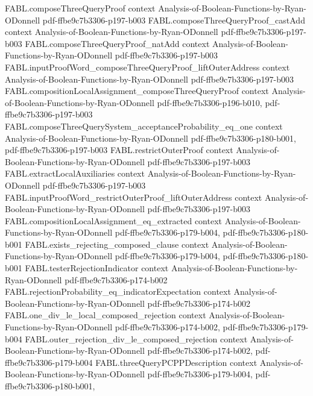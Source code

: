 \begin{theorem}
  {FABL.composeThreeQueryProof}
  {context}
  {Analysis-of-Boolean-Functions-by-Ryan-ODonnell}
  {pdf-ffbe9c7b3306-p197-b003}
\proofstep
  {FABL.composeThreeQueryProof_castAdd}
  {context}
  {Analysis-of-Boolean-Functions-by-Ryan-ODonnell}
  {pdf-ffbe9c7b3306-p197-b003}
\proofstep
  {FABL.composeThreeQueryProof_natAdd}
  {context}
  {Analysis-of-Boolean-Functions-by-Ryan-ODonnell}
  {pdf-ffbe9c7b3306-p197-b003}
\proofstep
  {FABL.inputProofWord_composeThreeQueryProof_liftOuterAddress}
  {context}
  {Analysis-of-Boolean-Functions-by-Ryan-ODonnell}
  {pdf-ffbe9c7b3306-p197-b003}
\proofstep
  {FABL.compositionLocalAssignment_composeThreeQueryProof}
  {context}
  {Analysis-of-Boolean-Functions-by-Ryan-ODonnell}
  {pdf-ffbe9c7b3306-p196-b010,
    pdf-ffbe9c7b3306-p197-b003}
\proofstep
  {FABL.composeThreeQuerySystem_acceptanceProbability_eq_one}
  {context}
  {Analysis-of-Boolean-Functions-by-Ryan-ODonnell}
  {pdf-ffbe9c7b3306-p180-b001,
    pdf-ffbe9c7b3306-p197-b003}
\proofstep
  {FABL.restrictOuterProof}
  {context}
  {Analysis-of-Boolean-Functions-by-Ryan-ODonnell}
  {pdf-ffbe9c7b3306-p197-b003}
\proofstep
  {FABL.extractLocalAuxiliaries}
  {context}
  {Analysis-of-Boolean-Functions-by-Ryan-ODonnell}
  {pdf-ffbe9c7b3306-p197-b003}
\proofstep
  {FABL.inputProofWord_restrictOuterProof_liftOuterAddress}
  {context}
  {Analysis-of-Boolean-Functions-by-Ryan-ODonnell}
  {pdf-ffbe9c7b3306-p197-b003}
\proofstep
  {FABL.compositionLocalAssignment_eq_extracted}
  {context}
  {Analysis-of-Boolean-Functions-by-Ryan-ODonnell}
  {pdf-ffbe9c7b3306-p179-b004,
    pdf-ffbe9c7b3306-p180-b001}
\proofstep
  {FABL.exists_rejecting_composed_clause}
  {context}
  {Analysis-of-Boolean-Functions-by-Ryan-ODonnell}
  {pdf-ffbe9c7b3306-p179-b004,
    pdf-ffbe9c7b3306-p180-b001}
\proofstep
  {FABL.testerRejectionIndicator}
  {context}
  {Analysis-of-Boolean-Functions-by-Ryan-ODonnell}
  {pdf-ffbe9c7b3306-p174-b002}
\proofstep
  {FABL.rejectionProbability_eq_indicatorExpectation}
  {context}
  {Analysis-of-Boolean-Functions-by-Ryan-ODonnell}
  {pdf-ffbe9c7b3306-p174-b002}
\proofstep
  {FABL.one_div_le_local_composed_rejection}
  {context}
  {Analysis-of-Boolean-Functions-by-Ryan-ODonnell}
  {pdf-ffbe9c7b3306-p174-b002,
    pdf-ffbe9c7b3306-p179-b004}
\proofstep
  {FABL.outer_rejection_div_le_composed_rejection}
  {context}
  {Analysis-of-Boolean-Functions-by-Ryan-ODonnell}
  {pdf-ffbe9c7b3306-p174-b002,
    pdf-ffbe9c7b3306-p179-b004}
\proofstep
  {FABL.threeQueryPCPPDescription}
  {context}
  {Analysis-of-Boolean-Functions-by-Ryan-ODonnell}
  {pdf-ffbe9c7b3306-p179-b004,
    pdf-ffbe9c7b3306-p180-b001,
}
\end{theorem}
